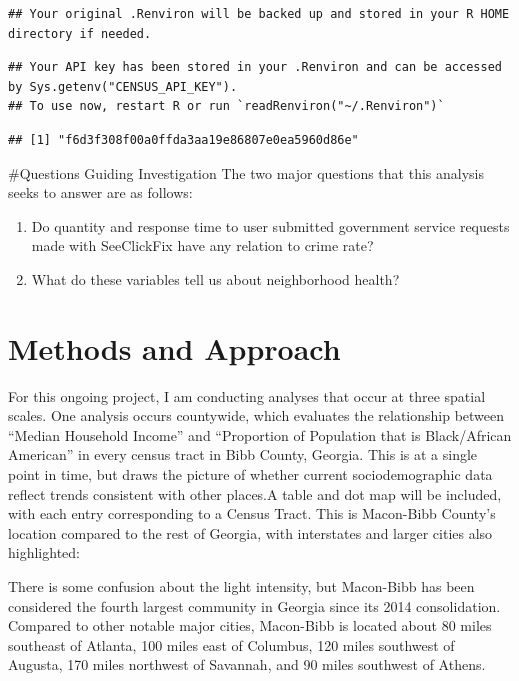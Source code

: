 \documentclass[
]{article}
\providecommand{\tightlist}{%
  \setlength{\itemsep}{0pt}\setlength{\parskip}{0pt}}
\begin{document}
\begin{verbatim}
## Your original .Renviron will be backed up and stored in your R HOME directory if needed.
\end{verbatim}

\begin{verbatim}
## Your API key has been stored in your .Renviron and can be accessed by Sys.getenv("CENSUS_API_KEY"). 
## To use now, restart R or run `readRenviron("~/.Renviron")`
\end{verbatim}

\begin{verbatim}
## [1] "f6d3f308f00a0ffda3aa19e86807e0ea5960d86e"
\end{verbatim}

\#Questions Guiding Investigation The two major questions that this
analysis seeks to answer are as follows:

\begin{enumerate}
\def\labelenumi{\arabic{enumi}.}
\tightlist
\item
  Do quantity and response time to user submitted government service
  requests made with SeeClickFix have any relation to crime rate?
\item
  What do these variables tell us about neighborhood health?
\end{enumerate}

\hypertarget{methods-and-approach}{%
\section{Methods and Approach}\label{methods-and-approach}}

For this ongoing project, I am conducting analyses that occur at three
spatial scales. One analysis occurs countywide, which evaluates the
relationship between ``Median Household Income'' and ``Proportion of
Population that is Black/African American'' in every census tract in
Bibb County, Georgia. This is at a single point in time, but draws the
picture of whether current sociodemographic data reflect trends
consistent with other places.A table and dot map will be included, with
each entry corresponding to a Census Tract. This is Macon-Bibb County's
location compared to the rest of Georgia, with interstates and larger
cities also highlighted:

There is some confusion about the light intensity, but Macon-Bibb has
been considered the fourth largest community in Georgia since its 2014
consolidation. Compared to other notable major cities, Macon-Bibb is
located about 80 miles southeast of Atlanta, 100 miles east of Columbus,
120 miles southwest of Augusta, 170 miles northwest of Savannah, and 90
miles southwest of Athens.
\end{document}
